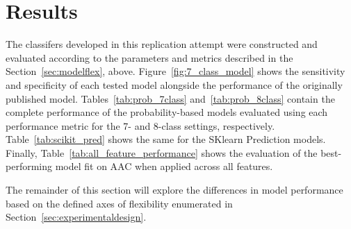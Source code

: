 \section {Results}
\label{sec:results}

The classifers developed in this replication attempt were constructed and evaluated according to the parameters
and metrics described in the Section~\ref{sec:modelflex}, above. Figure~\ref{fig:7_class_model} shows the sensitivity
and specificity of each tested model alongside the performance of the originally published model.
Tables~\ref{tab:prob_7class} and~\ref{tab:prob_8class} contain the complete performance of the probability-based models
evaluated using each performance metric for the 7- and 8-class settings, respectively. Table~\ref{tab:scikit_pred}
shows the same for the SKlearn Prediction models. Finally, Table~\ref{tab:all_feature_performance} shows the evaluation
of the best-performing model fit on AAC when applied across all features.

The remainder of this section will explore the differences in model performance based on the defined axes of
flexibility enumerated in Section~\ref{sec:experimentaldesign}.

